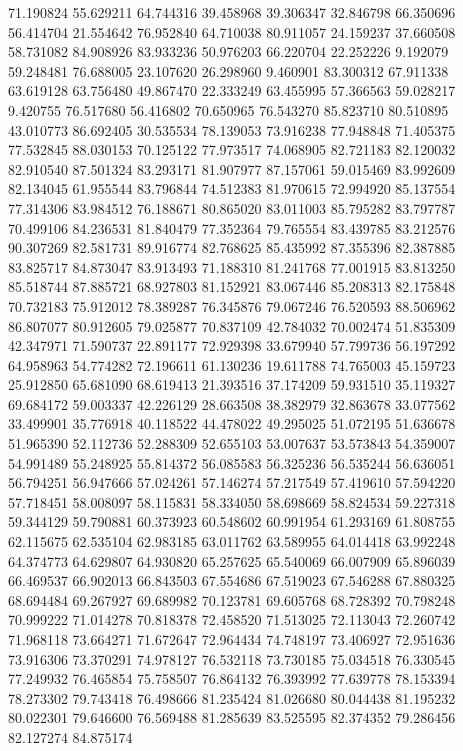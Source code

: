 71.190824
55.629211
64.744316
39.458968
39.306347
32.846798
66.350696
56.414704
21.554642
76.952840
64.710038
80.911057
24.159237
37.660508
58.731082
84.908926
83.933236
50.976203
66.220704
22.252226
9.192079
59.248481
76.688005
23.107620
26.298960
9.460901
83.300312
67.911338
63.619128
63.756480
49.867470
22.333249
63.455995
57.366563
59.028217
9.420755
76.517680
56.416802
70.650965
76.543270
85.823710
80.510895
43.010773
86.692405
30.535534
78.139053
73.916238
77.948848
71.405375
77.532845
88.030153
70.125122
77.973517
74.068905
82.721183
82.120032
82.910540
87.501324
83.293171
81.907977
87.157061
59.015469
83.992609
82.134045
61.955544
83.796844
74.512383
81.970615
72.994920
85.137554
77.314306
83.984512
76.188671
80.865020
83.011003
85.795282
83.797787
70.499106
84.236531
81.840479
77.352364
79.765554
83.439785
83.212576
90.307269
82.581731
89.916774
82.768625
85.435992
87.355396
82.387885
83.825717
84.873047
83.913493
71.188310
81.241768
77.001915
83.813250
85.518744
87.885721
68.927803
81.152921
83.067446
85.208313
82.175848
70.732183
75.912012
78.389287
76.345876
79.067246
76.520593
88.506962
86.807077
80.912605
79.025877
70.837109
42.784032
70.002474
51.835309
42.347971
71.590737
22.891177
72.929398
33.679940
57.799736
56.197292
64.958963
54.774282
72.196611
61.130236
19.611788
74.765003
45.159723
25.912850
65.681090
68.619413
21.393516
37.174209
59.931510
35.119327
69.684172
59.003337
42.226129
28.663508
38.382979
32.863678
33.077562
33.499901
35.776918
40.118522
44.478022
49.295025
51.072195
51.636678
51.965390
52.112736
52.288309
52.655103
53.007637
53.573843
54.359007
54.991489
55.248925
55.814372
56.085583
56.325236
56.535244
56.636051
56.794251
56.947666
57.024261
57.146274
57.217549
57.419610
57.594220
57.718451
58.008097
58.115831
58.334050
58.698669
58.824534
59.227318
59.344129
59.790881
60.373923
60.548602
60.991954
61.293169
61.808755
62.115675
62.535104
62.983185
63.011762
63.589955
64.014418
63.992248
64.374773
64.629807
64.930820
65.257625
65.540069
66.007909
65.896039
66.469537
66.902013
66.843503
67.554686
67.519023
67.546288
67.880325
68.694484
69.267927
69.689982
70.123781
69.605768
68.728392
70.798248
70.999222
71.014278
70.818378
72.458520
71.513025
72.113043
72.260742
71.968118
73.664271
71.672647
72.964434
74.748197
73.406927
72.951636
73.916306
73.370291
74.978127
76.532118
73.730185
75.034518
76.330545
77.249932
76.465854
75.758507
76.864132
76.393992
77.639778
78.153394
78.273302
79.743418
76.498666
81.235424
81.026680
80.044438
81.195232
80.022301
79.646600
76.569488
81.285639
83.525595
82.374352
79.286456
82.127274
84.875174
